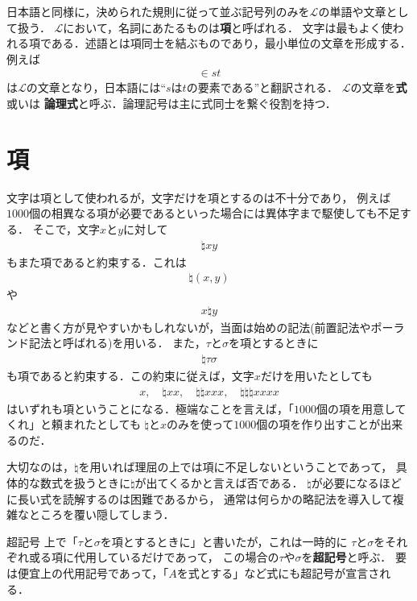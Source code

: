 \documentclass[a4j,10.5pt,oneside,openany]{jsbook}
\theoremstyle{mystyle}
\begin{document}
	日本語と同様に，決められた規則に従って並ぶ記号列のみを$\mathcal{L}$の単語や文章として扱う．
	$\mathcal{L}$において，名詞にあたるものは{\bf 項}と呼ばれる．
	文字は最もよく使われる項である．述語とは項同士を結ぶものであり，最小単位の文章を形成する．例えば
	\begin{align}
		\in st
	\end{align}
	は$\mathcal{L}$の文章となり，日本語には``$s$は$t$の要素である''と翻訳される．
	$\mathcal{L}$の文章を{\bf 式}或いは
	{\bf 論理式}と呼ぶ．論理記号は主に式同士を繋ぐ役割を持つ．
	
\section{項}
	
	文字は項として使われるが，文字だけを項とするのは不十分であり，
	例えば$1000$個の相異なる項が必要であるといった場合には異体字まで駆使しても不足する．
	そこで，文字$x$と$y$に対して
	\begin{align}
		\natural xy
	\end{align}
	もまた項であると約束する．これは
	\begin{align}
		\natural(x,y)
	\end{align}
	や
	\begin{align}
		x \natural y
	\end{align}
	などと書く方が見やすいかもしれないが，当面は始めの記法(前置記法やポーランド記法と呼ばれる)を用いる．
	また，$\tau$と$\sigma$を項とするときに
	\begin{align}
		\natural \tau \sigma
	\end{align}
	も項であると約束する．この約束に従えば，文字$x$だけを用いたとしても
	\begin{align}
		x,\quad \natural xx, \quad \natural \natural xxx, \quad \natural \natural \natural xxxx
	\end{align}
	はいずれも項ということになる．極端なことを言えば，「$1000$個の項を用意してくれ」と頼まれたとしても
	$\natural$と$x$のみを使って$1000$個の項を作り出すことが出来るのだ．
	
	大切なのは，$\natural$を用いれば理屈の上では項に不足しないということであって，
	具体的な数式を扱うときに$\natural$が出てくるかと言えば否である．
	$\natural$が必要になるほどに長い式を読解するのは困難であるから，
	通常は何らかの略記法を導入して複雑なところを覆い隠してしまう．
	
	\begin{itembox}[l]{超記号}
		上で「$\tau$と$\sigma$を項とするときに」と書いたが，これは一時的に
		$\tau$と$\sigma$をそれぞれ或る項に代用しているだけであって，
		この場合の$\tau$や$\sigma$を{\bf 超記号}と呼ぶ．
		要は便宜上の代用記号であって，「$A$を式とする」など式にも超記号が宣言される．
	\end{itembox}
	
\end{document}
